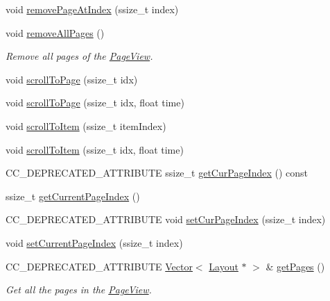 \begin{DoxyCompactItemize}
\item 
void \hyperlink{classui_1_1PageView_a58351bb2e6b271b846b56db3a5ae302b}{remove\+Page\+At\+Index} (ssize\+\_\+t index)
\item 
\mbox{\label{classui_1_1PageView_a8132e1b393db7c6f24d66f31d51533e7}} 
void \hyperlink{classui_1_1PageView_a8132e1b393db7c6f24d66f31d51533e7}{remove\+All\+Pages} ()
\begin{DoxyCompactList}\small\item\em Remove all pages of the \hyperlink{classui_1_1PageView}{Page\+View}. \end{DoxyCompactList}\item 
void \hyperlink{classui_1_1PageView_a054f9005201643dfb457965f26bf3625}{scroll\+To\+Page} (ssize\+\_\+t idx)
\item 
void \hyperlink{classui_1_1PageView_a770afe4df47aeda905850dfa1767ad8a}{scroll\+To\+Page} (ssize\+\_\+t idx, float time)
\item 
void \hyperlink{classui_1_1PageView_ad0c9adc302818366c639e6425f4da898}{scroll\+To\+Item} (ssize\+\_\+t item\+Index)
\item 
void \hyperlink{classui_1_1PageView_a5f686f92ace4bb68004b84124ff7aea2}{scroll\+To\+Item} (ssize\+\_\+t idx, float time)
\item 
C\+C\+\_\+\+D\+E\+P\+R\+E\+C\+A\+T\+E\+D\+\_\+\+A\+T\+T\+R\+I\+B\+U\+TE ssize\+\_\+t \hyperlink{classui_1_1PageView_a751a9452bd9a0bdb9e0cad6b69c70186}{get\+Cur\+Page\+Index} () const
\item 
ssize\+\_\+t \hyperlink{classui_1_1PageView_a0e0e1e05f1804d2b633ce7fb1ac16c6d}{get\+Current\+Page\+Index} ()
\item 
C\+C\+\_\+\+D\+E\+P\+R\+E\+C\+A\+T\+E\+D\+\_\+\+A\+T\+T\+R\+I\+B\+U\+TE void \hyperlink{classui_1_1PageView_a916f5697ad97899b1dd9942aeba76680}{set\+Cur\+Page\+Index} (ssize\+\_\+t index)
\item 
void \hyperlink{classui_1_1PageView_a919770a660944565ae72d4cc4b571121}{set\+Current\+Page\+Index} (ssize\+\_\+t index)
\item 
C\+C\+\_\+\+D\+E\+P\+R\+E\+C\+A\+T\+E\+D\+\_\+\+A\+T\+T\+R\+I\+B\+U\+TE \hyperlink{classVector}{Vector}$<$ \hyperlink{classui_1_1Layout}{Layout} $\ast$ $>$ \& \hyperlink{classui_1_1PageView_a0615c5ffc511cb07537188b9281513f1}{get\+Pages} ()
\begin{DoxyCompactList}\small\item\em Get all the pages in the \hyperlink{classui_1_1PageView}{Page\+View}. \end{DoxyCompactList}\item 

\end{DoxyCompactItemize}
